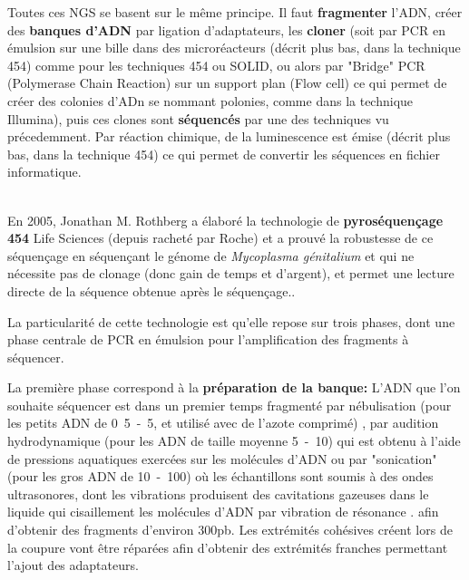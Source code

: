 \documentclass[a4paper]{article}
\begin{document}
Toutes ces NGS se basent sur le même principe. Il faut \textbf{fragmenter} l'ADN, créer des \textbf{banques d'ADN} par ligation d'adaptateurs, les \textbf{cloner} (soit par PCR en émulsion sur une bille dans des microréacteurs (décrit plus bas, dans la technique 454) comme pour les techniques 454 ou SOLID, ou alors par "Bridge" PCR (Polymerase Chain Reaction) sur un support plan (Flow cell) ce qui permet de créer des colonies d'ADn se nommant polonies, comme dans la technique Illumina), puis ces clones sont \textbf{séquencés} par une des techniques vu précedemment. Par réaction chimique, de la luminescence est émise (décrit plus bas, dans la technique 454) ce qui permet de convertir les séquences en fichier informatique.

~~\\

En 2005, Jonathan M. Rothberg a élaboré la technologie de \textbf{pyroséquençage 454} Life Sciences (depuis racheté par Roche) et a prouvé la robustesse de ce séquençage en séquençant le génome de \textit{Mycoplasma génitalium} \cite{Margulies:2005aa} et qui ne nécessite pas de clonage (donc gain de temps et d’argent), et permet une lecture directe de la séquence obtenue après le séquençage.\cite{sengenes2012developpement}.

La particularité de cette technologie est qu'elle repose sur trois phases, dont une phase centrale de PCR en émulsion pour l'amplification des fragments à séquencer. \cite{Margulies:2005aa} \cite{sengenes2012developpement}

La première phase correspond à la \textbf{préparation de la banque:} L’ADN que l'on souhaite séquencer est dans un premier temps fragmenté par nébulisation \cite{loman2012performance} (pour les petits ADN de \unit{0.5-5}{\micro\metre}\cite{Prodromou:2007aa}, et utilisé avec de l'azote comprimé)\cite{syed2009next} , par audition hydrodynamique \cite{poptsova2014non} (pour les ADN de taille moyenne \unit{5-10}{\micro\metre})\cite{Prodromou:2007aa} qui est obtenu à l'aide de pressions aquatiques exercées sur les molécules d'ADN \cite{poptsova2014non} ou par "sonication" \cite{Knierim:2011aa} (pour les gros ADN de \unit{10-100}{\micro\metre})\cite{Prodromou:2007aa} où les échantillons sont soumis à des ondes ultrasonores, dont les vibrations produisent des cavitations gazeuses dans le liquide qui cisaillement les molécules d'ADN par vibration de résonance \cite{Knierim:2011aa}. afin d'obtenir des fragments d'environ 300pb. Les extrémités cohésives créent lors de la coupure vont être réparées afin d’obtenir des extrémités franches permettant l’ajout des adaptateurs.\cite{Prodromou:2007aa} \cite{sengenes2012developpement}
\end{document}
